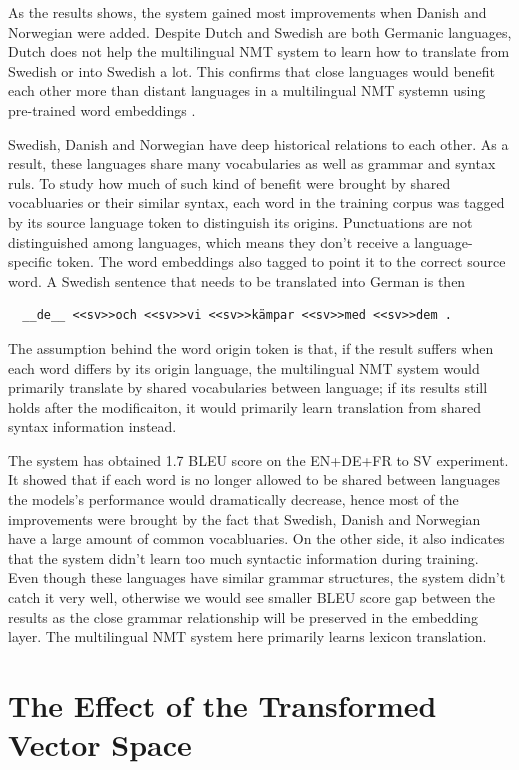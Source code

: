 \documentclass[thesis,fonts=libertine]{cluu}
\begin{document}
As the results shows, the system gained most improvements when Danish and Norwegian were added. Despite Dutch and Swedish are both Germanic languages, Dutch does not help the multilingual NMT system to learn how to translate from Swedish or into Swedish a lot. This confirms that close languages would benefit each other more than distant languages in a multilingual NMT systemn using pre-trained word embeddings \parencite{Qi:2018aa}.

Swedish, Danish and Norwegian have deep historical relations to each other. As a result, these languages share many vocabularies as well as grammar and syntax ruls. To study how much of such kind of benefit were brought by shared vocabluaries or their similar syntax, each word in the training corpus was tagged by its source language token to distinguish its origins. Punctuations are not distinguished among languages, which means they don't receive a language-specific token. The word embeddings also tagged to point it to the correct source word. A Swedish sentence that needs to be translated into German is then 

\begin{verbatim}
  __de__ <<sv>>och <<sv>>vi <<sv>>kämpar <<sv>>med <<sv>>dem .
\end{verbatim}

The assumption behind the word origin token is that, if the result suffers when each word differs by its origin language, the multilingual NMT system would primarily translate by shared vocabularies between language; if its results still holds after the modificaiton, it would primarily learn translation from shared syntax information instead.

The system has obtained 1.7 BLEU score on the EN+DE+FR to SV experiment. It showed that if each word is no longer allowed to be shared between languages the models's performance would dramatically decrease, hence most of the improvements were brought by the fact that Swedish, Danish and Norwegian have a large amount of common vocabluaries. On the other side, it also indicates that the system didn't learn too much syntactic information during training. Even though these languages have similar grammar structures, the system didn't catch it very well, otherwise we would see smaller BLEU score gap between the results as the close grammar relationship will be preserved in the embedding layer. The multilingual NMT system here primarily learns lexicon translation.

\section{The Effect of the Transformed Vector Space}
\end{document}
